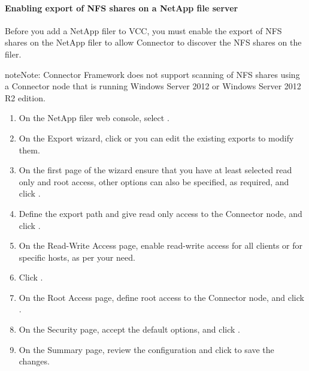 \documentclass[letterpaper,10pt,english]{sphinxmanual}
\begin{document}
\paragraph{Enabling export of NFS shares on a NetApp file server}
\label{\detokenize{mcdmp_app_ug:enabling-export-of-nfs-shares-on-a-netapp-file-server}}
Before you add a NetApp filer to VCC, you must enable the export of NFS shares on the NetApp filer to allow Connector to discover the NFS shares on the filer.

\begin{sphinxadmonition}{note}{Note:}
Connector Framework does not support scanning of NFS shares using a Connector node that is running Windows Server 2012 or Windows Server 2012 R2 edition.
\end{sphinxadmonition}

\begin{enumerate}
\item {} 
On the NetApp filer web console, select .

\item {} 
On the Export wizard, click  or you can edit the existing exports to modify them.

\item {} 
On the first page of the wizard ensure that you have at least selected read only and root access, other options can also be specified, as required, and click .

\item {} 
Define the export path and give read only access to the Connector node, and click .

\item {} 
On the Read-Write Access page, enable read-write access for all clients or for specific hosts, as per your need.

\item {} 
Click .

\item {} 
On the Root Access page, define root access to the Connector node, and click .

\item {} 
On the Security page, accept the default options, and click .

\item {} 
On the Summary page, review the configuration and click  to save the changes.

\end{enumerate}
\end{document}
